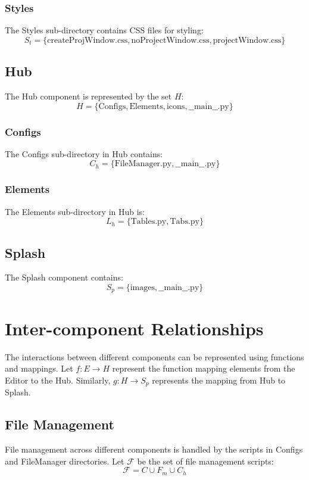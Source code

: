 \subsubsection*{Styles}
The Styles sub-directory contains CSS files for styling:
\[
S_t = \{\text{createProjWindow.css}, \text{noProjectWindow.css}, \text{projectWindow.css}\}
\]

\subsection*{Hub}
The Hub component is represented by the set \( H \):
\[
H = \{ \text{Configs}, \text{Elements}, \text{icons}, \text{\_\_main\_\_.py} \}
\]

\subsubsection*{Configs}
The Configs sub-directory in Hub contains:
\[
C_h = \{ \text{FileManager.py}, \text{\_\_main\_\_.py} \}
\]

\subsubsection*{Elements}
The Elements sub-directory in Hub is:
\[
L_h = \{ \text{Tables.py}, \text{Tabs.py} \}
\]

\subsection*{Splash}
The Splash component contains:
\[
S_p = \{ \text{images}, \text{\_\_main\_\_.py} \}
\]

\section*{Inter-component Relationships}
The interactions between different components can be represented using functions and mappings. Let \( f: E \to H \) represent the function mapping elements from the Editor to the Hub. Similarly, \( g: H \to S_p \) represents the mapping from Hub to Splash.

\subsection*{File Management}
File management across different components is handled by the scripts in Configs and FileManager directories. Let \( \mathcal{F} \) be the set of file management scripts:
\[
\mathcal{F} = C \cup F_m \cup C_h
\]

